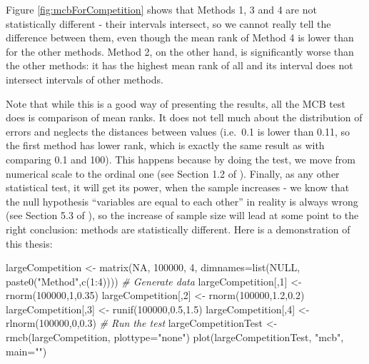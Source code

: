 \documentclass[
]{book}
\newenvironment{Shaded}{\begin{snugshade}}{\end{snugshade}}
\newcommand{\AttributeTok}[1]{\textcolor[rgb]{0.77,0.63,0.00}{#1}}
\newcommand{\CommentTok}[1]{\textcolor[rgb]{0.56,0.35,0.01}{\textit{#1}}}
\newcommand{\ConstantTok}[1]{\textcolor[rgb]{0.00,0.00,0.00}{#1}}
\newcommand{\DecValTok}[1]{\textcolor[rgb]{0.00,0.00,0.81}{#1}}
\newcommand{\FloatTok}[1]{\textcolor[rgb]{0.00,0.00,0.81}{#1}}
\newcommand{\FunctionTok}[1]{\textcolor[rgb]{0.00,0.00,0.00}{#1}}
\newcommand{\NormalTok}[1]{#1}
\newcommand{\OtherTok}[1]{\textcolor[rgb]{0.56,0.35,0.01}{#1}}
\newcommand{\SpecialCharTok}[1]{\textcolor[rgb]{0.00,0.00,0.00}{#1}}
\newcommand{\StringTok}[1]{\textcolor[rgb]{0.31,0.60,0.02}{#1}}
\theoremstyle{definition}
\theoremstyle{definition}
\theoremstyle{definition}
\theoremstyle{definition}
\theoremstyle{remark}
\begin{document}
Figure \ref{fig:mcbForCompetition} shows that Methods 1, 3 and 4 are not statistically different - their intervals intersect, so we cannot really tell the difference between them, even though the mean rank of Method 4 is lower than for the other methods. Method 2, on the other hand, is significantly worse than the other methods: it has the highest mean rank of all and its interval does not intersect intervals of other methods.

Note that while this is a good way of presenting the results, all the MCB test does is comparison of mean ranks. It does not tell much about the distribution of errors and neglects the distances between values (i.e.~0.1 is lower than 0.11, so the first method has lower rank, which is exactly the same result as with comparing 0.1 and 100). This happens because by doing the test, we move from numerical scale to the ordinal one (see Section 1.2 of \citet{SvetunkovSBA}). Finally, as any other statistical test, it will get its power, when the sample increases - we know that the null hypothesis ``variables are equal to each other'' in reality is always wrong (see Section 5.3 of \citet{SvetunkovSBA}), so the increase of sample size will lead at some point to the right conclusion: methods are statistically different. Here is a demonstration of this thesis:

\begin{Shaded}
\begin{Highlighting}[]
\NormalTok{largeCompetition }\OtherTok{\textless{}{-}} 
  \FunctionTok{matrix}\NormalTok{(}\ConstantTok{NA}\NormalTok{, }\DecValTok{100000}\NormalTok{, }\DecValTok{4}\NormalTok{,}
         \AttributeTok{dimnames=}\FunctionTok{list}\NormalTok{(}\ConstantTok{NULL}\NormalTok{, }\FunctionTok{paste0}\NormalTok{(}\StringTok{"Method"}\NormalTok{,}\FunctionTok{c}\NormalTok{(}\DecValTok{1}\SpecialCharTok{:}\DecValTok{4}\NormalTok{))))}
\CommentTok{\# Generate data}
\NormalTok{largeCompetition[,}\DecValTok{1}\NormalTok{] }\OtherTok{\textless{}{-}} \FunctionTok{rnorm}\NormalTok{(}\DecValTok{100000}\NormalTok{,}\DecValTok{1}\NormalTok{,}\FloatTok{0.35}\NormalTok{)}
\NormalTok{largeCompetition[,}\DecValTok{2}\NormalTok{] }\OtherTok{\textless{}{-}} \FunctionTok{rnorm}\NormalTok{(}\DecValTok{100000}\NormalTok{,}\FloatTok{1.2}\NormalTok{,}\FloatTok{0.2}\NormalTok{)}
\NormalTok{largeCompetition[,}\DecValTok{3}\NormalTok{] }\OtherTok{\textless{}{-}} \FunctionTok{runif}\NormalTok{(}\DecValTok{100000}\NormalTok{,}\FloatTok{0.5}\NormalTok{,}\FloatTok{1.5}\NormalTok{)}
\NormalTok{largeCompetition[,}\DecValTok{4}\NormalTok{] }\OtherTok{\textless{}{-}} \FunctionTok{rlnorm}\NormalTok{(}\DecValTok{100000}\NormalTok{,}\DecValTok{0}\NormalTok{,}\FloatTok{0.3}\NormalTok{)}
\CommentTok{\# Run the test}
\NormalTok{largeCompetitionTest }\OtherTok{\textless{}{-}} \FunctionTok{rmcb}\NormalTok{(largeCompetition, }\AttributeTok{plottype=}\StringTok{"none"}\NormalTok{)}
\FunctionTok{plot}\NormalTok{(largeCompetitionTest, }\StringTok{"mcb"}\NormalTok{, }\AttributeTok{main=}\StringTok{""}\NormalTok{)}
\end{Highlighting}
\end{Shaded}
\end{document}
